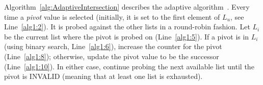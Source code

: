 Algorithm~\ref{alg:AdaptiveIntersection} describes the adaptive algorithm~\cite{Demaine2000ASI}. Every time a \emph{pivot} value is selected (initially, it is set to the first element of $L_u$, see Line~\ref{alg1:2}). It is probed against the other lists in a round-robin fashion. Let $L_i$ be the current list where the {pivot} is probed on (Line~\ref{alg1:5}). If a pivot is in $L_i$ (using binary search, Line~\ref{alg1:6}), increase the counter for the {pivot} (Line~\ref{alg1:8}); otherwise, update the {pivot} value to be the successor (Line~\ref{alg1:10}). In either case, continue probing the next available list until the pivot is INVALID (meaning that at least one list is exhausted).



%

